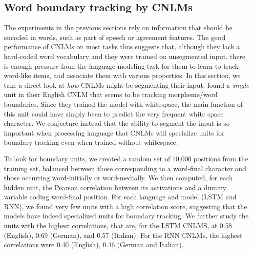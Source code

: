 \subsection{Word boundary tracking by CNLMs}
\label{sec:segmentation}


The experiments in the previous sections rely on information that
should be encoded in words, such as part of speech or agreement
features. The good performance of CNLMs on most tasks thus suggests
that, although they lack a hard-coded word vocabulary and they were
trained on unsegmented input, there is enough pressure from the
language modeling task for them to learn to track word-like items, and
associate them with various properties. In this section, we take a
direct look at \emph{how} CNLMs might be segmenting their input.
 found a \emph{single} unit in
their English CNLM that seems to be tracking morpheme/word boundaries.
Since they trained the model with whitespace, the main function of
this unit could have simply been to predict the very frequent white
space character. We conjecture instead that the ability to segment the
input is so important when processing language that CNLMs will
specialize units for boundary tracking even when trained without
whitespace.

To look for boundary units, we created a random set of 10,000
positions from the training set, balanced between those corresponding
to a word-final character and those occurring word-initially or
word-medially.  We then computed, for each hidden unit, the Pearson
correlation between its activations and a dummy variable coding
word-final position. For each language and model (LSTM and RNN), we
found very few units with a high correlation score, suggesting that
the models have indeed specialized units for boundary tracking. We
further study the units with the highest correlations, that are, for
the LSTM CNLMS, at 0.58 (English), 0.69 (German), and 0.57 (Italian).
For the RNN CNLMs, the highest correlations were 0.40 (English), 0.46
(German and Italian).

